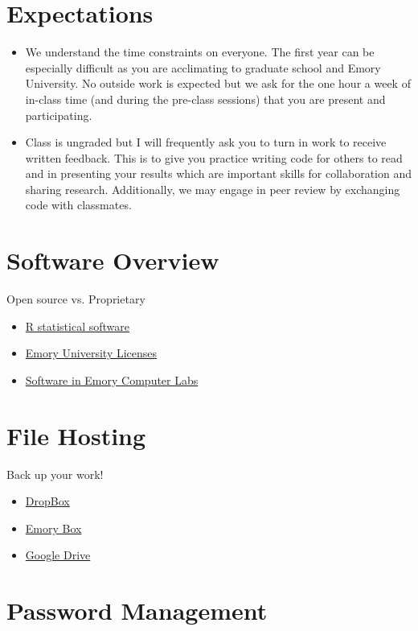 \documentclass[11pt]{article}
\begin{document}
\section*{Expectations}
\begin{itemize}
  \item We understand the time constraints on everyone. The first year can be especially difficult as you are acclimating to graduate school and Emory University. No outside work is expected but we ask for the one hour a week of in-class time (and during the pre-class sessions) that you are present and participating.
  \item Class is ungraded but I will frequently ask you to turn in work to receive written feedback. This is to give you practice writing code for others to read and in presenting your results which are important skills for collaboration and sharing research. Additionally, we may engage in peer review by exchanging code with classmates.
\end{itemize}

\section*{Software Overview}
Open source vs. Proprietary
  \begin{itemize}
    \item \href{https://cran.r-project.org/}{R statistical software}
    \item \href{http://it.emory.edu/software/software_distribution.html}{Emory University Licenses}
    \item \href{https://it.emory.edu/studentdigitallife/study_production_spaces/student-labs/software.html)}{Software in Emory Computer Labs}
  \end{itemize}


\section*{File Hosting}
Back up your work!
\begin{itemize}
  \item \href{https://www.dropbox.com/}{DropBox}
  \item \href{http://it.emory.edu/office365/BOX.html}{Emory Box}
  \item \href{https://www.google.com/drive/}{Google Drive}
\end{itemize}

\section*{Password Management}
\end{document}
